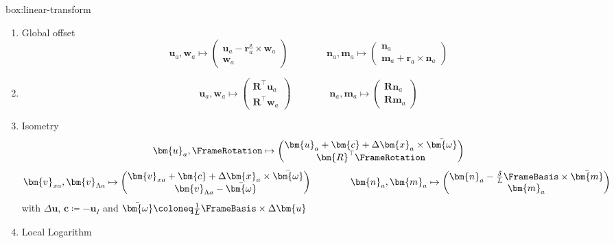 


\vspace{5ex}

\begin{ambox}{box:linear-transform}
\begin{enumerate}
    \item Global offset
    \[
    \bm{u}_a,\bm{w}_a \mapsto \begin{pmatrix}
        \bm{u}_a - \bm{r}_a^{\mathrm{g}}\times \bm{w}_a \\
        \bm{w}_a
    \end{pmatrix}
    \qquad\qquad
    \bm{n}_a,\bm{m}_a \mapsto \begin{pmatrix}
        \bm{n}_a \\
        \bm{m}_a + \bm{r}_a \times\bm{n}_a
    \end{pmatrix}
    \]
    \item 
    \[
    \bm{u}_a,\bm{w}_a \mapsto \begin{pmatrix}
        \bm{R}^{\top}\bm{u}_a \\
        \bm{R}^{\top}\bm{w}_a
    \end{pmatrix}
    \qquad\qquad
    \bm{n}_a,\bm{m}_a \mapsto \begin{pmatrix}
        \bm{R}\bm{n}_a \\
        \bm{R}\bm{m}_a
    \end{pmatrix}
    \]
    \item Isometry
    \[
    \bm{u}_a,\FrameRotation \mapsto \begin{pmatrix}
        \bm{u}_{a} + \bm{c} + \Delta\bm{x}_a \times \bar{\bm{\omega}} \\
        \bm{R}^{\top}\FrameRotation
    \end{pmatrix}
    \]
    \[
    \bm{v}_{xa},\bm{v}_{\Lambda a} \mapsto \begin{pmatrix}
        \bm{v}_{xa} + \bm{c} + \Delta\bm{x}_{a} \times \bar{\bm{\omega}} \\
        \bm{v}_{\Lambda a} - \bar{\bm{\omega}}
    \end{pmatrix}
    \qquad\qquad
    \bm{n}_a,\bm{m}_a \mapsto \begin{pmatrix}
        \bm{n}_a - \frac{\delta}{L}\FrameBasis \times \bar{\bm{m}} \\
        \bm{m}_a
    \end{pmatrix}
    \]
    with \(\Delta\bm{u}\), \(\bm{c} \coloneq - \bm{u}_I\) and \(\bar{\bm{\omega}} \coloneq \frac{1}{L} \FrameBasis \times \Delta \bm{u}\)

    \item Local Logarithm

\end{enumerate}
\end{ambox}

